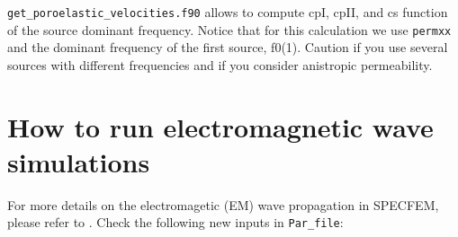 \texttt{get\_poroelastic\_velocities.f90} allows to compute cpI, cpII, and cs function of
the source dominant frequency. Notice that for this calculation we use \texttt{permxx}
and the dominant frequency of the first source, f0(1). Caution if you use
several sources with different frequencies and if you consider anistropic
permeability.


\section{How to run electromagnetic wave simulations}

For more details on the electromagetic (EM) wave propagation in SPECFEM, please refer to \cite{Morency20}.
Check the following new inputs in \texttt{Par\_file}:
%
